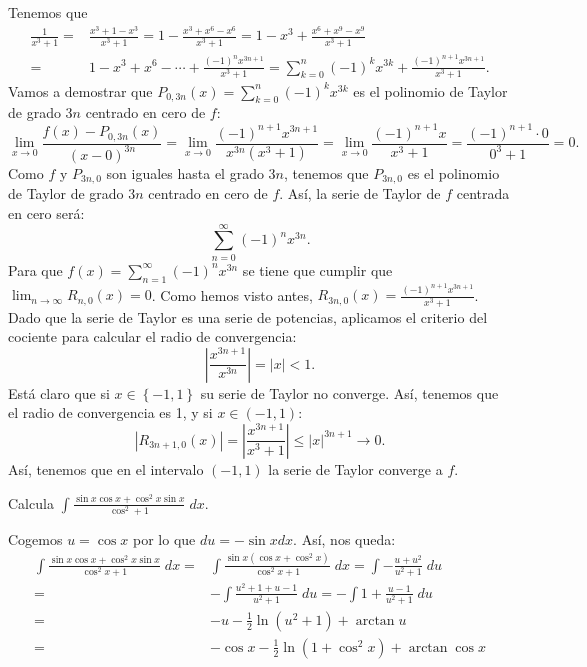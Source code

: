 \documentclass{article}
\begin{document}
\begin{sol}
Tenemos que 
\[
\begin{split}
	\frac{1}{x^{3}+1} = & \frac{x^{3}+1-x^{3}}{x^{3}+1} = 1 - \frac{x^{3}+x^{6}-x^{6}}{x^{3}+1}= 1 - x^{3} + \frac{x^{6}+x^{9}-x^{9}}{x^{3}+1} \\
	= & 1 - x^{3}+x^{6} - \cdots  + \frac{\left(-1\right)^{n}x^{3n+1}}{x^{3}+1} 
	=  \sum^{n}_{k = 0}\left(-1\right)^{k}x^{3k} + \frac{\left(-1\right)^{n+1}x^{3n+1}}{x^{3}+1}.
\end{split}
\]
Vamos a demostrar que $\displaystyle P_{0,3n}\left(x\right) = \sum^{n}_{k = 0}\left(-1\right)^{k}x^{3k} $ es el polinomio de Taylor de grado $\displaystyle 3n $ centrado en cero de $\displaystyle f $:
\[\lim_{x \to 0}\frac{f\left(x\right)-P_{0,3n}\left(x\right)}{\left(x-0\right)^{3n}} = \lim_{x \to 0}\frac{\left(-1\right)^{n+1}x^{3n+1}}{x^{3n}\left(x^{3}+1\right)} = \lim_{x \to 0}\frac{\left(-1\right)^{n+1}x}{x^{3}+1} = \frac{\left(-1\right)^{n+1} \cdot 0}{0^{3}+1} = 0 .\]
Como $\displaystyle f $ y $\displaystyle P_{3n,0} $ son iguales hasta el grado $\displaystyle 3n $, tenemos que $\displaystyle P_{3n, 0} $ es el polinomio de Taylor de grado $\displaystyle 3n $ centrado en cero de $\displaystyle f $. Así, la serie de Taylor de $\displaystyle f $ centrada en cero será:
\[\sum^{\infty}_{n = 0}\left(-1\right)^{n}x^{3n} .\]
Para que $\displaystyle f\left(x\right) = \sum^{\infty}_{n = 1}\left(-1\right)^{n}x^{3n} $ se tiene que cumplir que $\displaystyle \lim_{n \to \infty}R_{n,0}\left(x\right) = 0  $. Como hemos visto antes, $\displaystyle R_{3n, 0}\left(x\right) = \frac{\left(-1\right)^{n+1}x^{3n+1}}{x^{3}+1} $. Dado que la serie de Taylor es una serie de potencias, aplicamos el criterio del cociente para calcular el radio de convergencia:
\[ \left|\frac{x^{3n+1}}{x^{3n}}\right| = \left|x\right| < 1.\]
Está claro que si $\displaystyle x \in \left\{ -1,1\right\}  $ su serie de Taylor no converge. Así, tenemos que el radio de convergencia es 1, y si $\displaystyle x \in \left(-1,1\right) $:
\[ \left|R_{3n+1,0}\left(x\right)\right| = \left|\frac{x^{3n+1}}{x^{3}+1}\right| \leq \left|x\right|^{3n+1} \to 0.\]
Así, tenemos que en el intervalo $\displaystyle \left(-1,1\right) $ la serie de Taylor converge a $\displaystyle f $.
\end{sol}
\begin{ej}
Calcula $\displaystyle \int \frac{\sin x \cos x + \cos ^{2}x \sin x}{\cos ^{2}+1} \; dx $.
\end{ej}
\begin{sol} 
	Cogemos $\displaystyle u = \cos x $ por lo que $\displaystyle du = - \sin x dx $. Así, nos queda:
\[
\begin{split}
	\int \frac{\sin x \cos x + \cos ^{2}x \sin x}{\cos ^{2}x + 1} \; dx = & \int \frac{\sin x\left(\cos x + \cos ^{2}x\right)}{\cos ^{2}x + 1} \; dx = \int -\frac{u+u^{2}}{u^{2}+1} \; du \\
	= & - \int \frac{u^{2}+1+u-1}{u^{2}+1} \; du = -\int 1 + \frac{u-1}{u^{2}+1} \; du \\
	= & - u - \frac{1}{2}\ln\left(u^{2}+1\right) + \arctan u\\
	= & - \cos x - \frac{1}{2}\ln\left(1+\cos^{2}x\right)+\arctan \cos x
\end{split}
\]
\end{sol}
\end{document}
